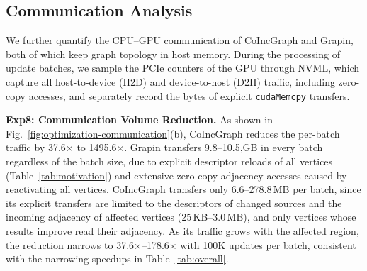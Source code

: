 \subsection{Communication Analysis}
\label{sec:communication}

We further quantify the CPU--GPU communication of CoIncGraph and Grapin, both of which keep graph topology in host memory. During the processing of update batches, we sample the PCIe counters of the GPU through NVML, which capture all host-to-device (H2D) and device-to-host (D2H) traffic, including zero-copy accesses, and separately record the bytes of explicit \texttt{cudaMemcpy} transfers.

\textbf{Exp8: Communication Volume Reduction.} As shown in Fig.~\ref{fig:optimization-communication}(b), CoIncGraph reduces the per-batch traffic by 37.6$\times$ to 1495.6$\times$. Grapin transfers 9.8--10.5,GB in every batch regardless of the batch size, due to explicit descriptor reloads of all vertices (Table~\ref{tab:motivation}) and extensive zero-copy adjacency accesses caused by reactivating all vertices. CoIncGraph transfers only 6.6--278.8\,MB per batch, since its explicit transfers are limited to the descriptors of changed sources and the incoming adjacency of affected vertices (25\,KB--3.0\,MB), and only vertices whose results improve read their adjacency. As its traffic grows with the affected region, the reduction narrows to 37.6$\times$--178.6$\times$ with 100K updates per batch, consistent with the narrowing speedups in Table~\ref{tab:overall}.


